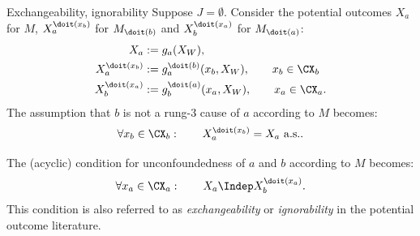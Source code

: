 \begin{frame}{Exchangeability, ignorability}
  Suppose $J = \emptyset$. 
  Consider the potential outcomes $X_a$ for $M$, $X_a^{\doit(x_b)}$ for $M_{\doit(b)}$ and $X_{b}^{\doit(x_{a})}$ for $M_{\doit(a)}$:
\begin{align*}
  X_a &:= g_a(X_W), \\
  X_{a}^{\doit(x_b)} &:= g^{\doit(b)}_a(x_b,X_W), \qquad x_b \in \CX_b\\
  X_{b}^{\doit(x_a)} &:= g^{\doit(a)}_b(x_a,X_W), \qquad x_a \in \CX_a.
\end{align*}
The assumption that $b$ is not a rung-3 cause of $a$ according to $M$ becomes:
  $$\forall x_b \in \CX_b: \qquad X_a^{\doit(x_b)} = X_a\ \mathrm{a.s.}.$$

The (acyclic) condition for unconfoundedness of $a$ and $b$ according to $M$ becomes:
  $$\forall x_a \in \CX_a : \qquad X_a \Indep X_b^{\doit(x_a)}.$$
This condition is also referred to as \emph{exchangeability} or \emph{ignorability} in the potential outcome literature. 
\end{frame}

